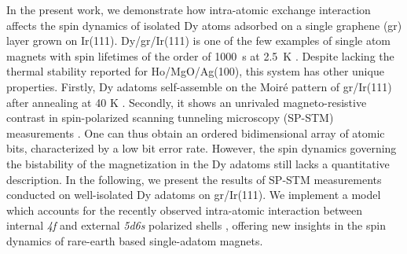 \documentclass[
reprint,amsmath,amssymb,aps]{revtex4-2}
\begin{document}
In the present work, we demonstrate how intra-atomic exchange interaction affects the spin dynamics of isolated Dy atoms adsorbed on a single graphene (gr) layer grown on Ir(111). Dy/gr/Ir(111) is one of the few examples of single atom magnets \cite{Natterer2018,kiralyOrbitallyDerivedSingleatom2018} with spin lifetimes of the order of 1000~s at 2.5~K \cite{baltic2016}. Despite lacking the thermal stability reported for Ho/MgO/Ag(100), this system has other unique properties. Firstly, Dy adatoms self-assemble on the Moiré pattern of gr/Ir(111) after annealing at 40 K \cite{pivettaDirectCaptureElectrostatic2018}. Secondly, it shows an unrivaled magneto-resistive contrast in spin-polarized scanning tunneling microscopy (SP-STM) measurements \cite{pivettaMeasuringIntraAtomicExchange2020}. One can thus obtain an ordered bidimensional array of atomic bits, characterized by a low bit error rate.
However, the spin dynamics governing the bistability of the magnetization in the Dy adatoms still lacks a quantitative  description.
In the following, we present the results of SP-STM  measurements conducted  on  well-isolated  Dy  adatoms on gr/Ir(111). We implement a model which accounts for the  recently  observed  intra-atomic  interaction  between internal \textit{4f} and  external \textit{5d6s} polarized  shells  \cite{pivettaMeasuringIntraAtomicExchange2020}, offering new insights in the spin dynamics  of  rare-earth  based  single-adatom  magnets.
\end{document}
